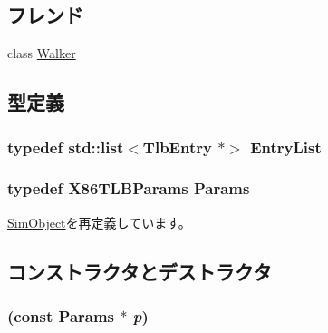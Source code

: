 \subsection*{フレンド}
\begin{DoxyCompactItemize}
\item 
class \hyperlink{classX86ISA_1_1TLB_a561951adc2bae72717df4b975c66f02f}{Walker}
\end{DoxyCompactItemize}


\subsection{型定義}
\hypertarget{classX86ISA_1_1TLB_ad1a39a8d54f6e4053979f8c24fe5dcfd}{
\subsubsection[{EntryList}]{\setlength{\rightskip}{0pt plus 5cm}typedef {\bf std::list}$<$TlbEntry $\ast$$>$ {\bf EntryList}}}
\label{classX86ISA_1_1TLB_ad1a39a8d54f6e4053979f8c24fe5dcfd}
\hypertarget{classX86ISA_1_1TLB_a9122b46075a6970493519b96564e6356}{
\subsubsection[{Params}]{\setlength{\rightskip}{0pt plus 5cm}typedef X86TLBParams {\bf Params}}}
\label{classX86ISA_1_1TLB_a9122b46075a6970493519b96564e6356}


\hyperlink{classSimObject_a0f0761d2db586a23bb2a2880b8f387bb}{SimObject}を再定義しています。

\subsection{コンストラクタとデストラクタ}
\hypertarget{classX86ISA_1_1TLB_acb886bd3c59f00c21be9ceaaf25dab97}{
\subsubsection[{TLB}]{ (const {\bf Params} $\ast$ {\em p})}}
\label{classX86ISA_1_1TLB_acb886bd3c59f00c21be9ceaaf25dab97}



